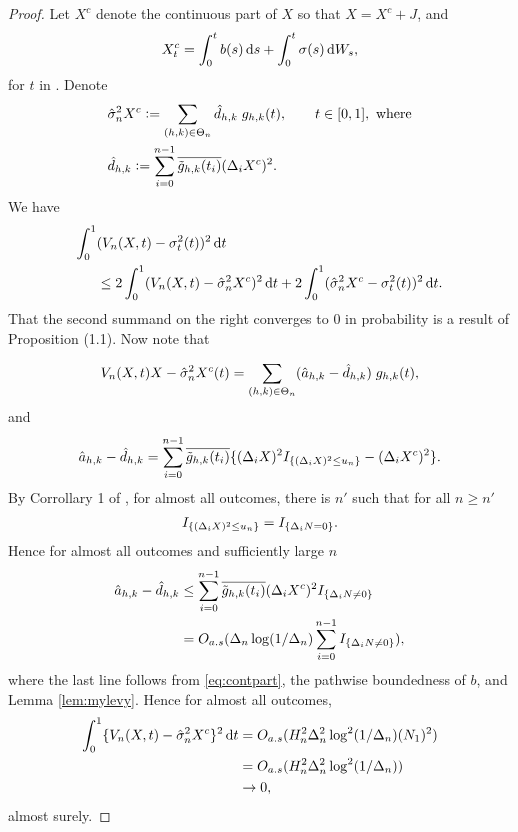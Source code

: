 \begin{proof} 
  Let $X^c$ denote the continuous part of $X$ so that $X = X^c + J$, and 
  \begin{align}
  X^c_t = \int^t_0 b(s) \D s + \int^t_0 \sigma(s) \D W_s,
    \label{eq:contpart}
  \end{align}
  for $t$ in \domain. Denote
  \begin{align}
    & \hat{\sigma}_{n}^2{X^c}:=\sum_{(h,k) \in \Theta_n} \hat{d}_{h,k}\;g_{h,k}(t), \qquad  t \in [0,1], \text{ where}\\
  &\hat{d}_{h,k} := \sum_{i =0}^{n-1} \overline{\tilde{g}_{h,k}(t_i)} (\Delta_i X^c)^2.  \notag
    \label{}
  \end{align}
We have
\begin{align}
  \int_0^1 & (\jvn  - \sv(t))^2\D t \notag\\
  & \le  2 \int_0^1  (\jvn  - \svn{X^c})^2\D t +   2\int_0^1  (\svn{X^c} - \sv(t) )^2\D t.
\end{align}
That the second summand on the right converges to 0 in probability is a result of Proposition (1.1). 
Now note that

\begin{align}
  V_n(X, t){X}  - \hat{\sigma}_{n}^2{X^c}(t) = \sum_{(h,k) \in \Theta_n} (\hat{a}_{h,k} - \hat{d}_{h,k})\;g_{h,k}(t),\notag
  \label{}
\end{align}
and 
\begin{align}
  \hat{a}_{h,k} - \hat{d}_{h,k} = \sum_{i =0}^{n-1} \overline{\tilde{g}_{h,k}(t_i)}\{ (\Delta_i X)^2 I_{\{(\Delta_i X)^2 \le u_n\}}- (\Delta_i X^c)^2\}.\notag
  \label{}
\end{align}
By Corrollary 1 of \cite{Mancini2009}, for almost all outcomes, there is $n'$ such that for all $n \ge n'$ 
\begin{align}
  I_{\{(\Delta_i X)^2 \le u_n\}} =I_{\{\Delta_i N = 0\}}. \notag
  \label{}
\end{align}
Hence for almost all outcomes and sufficiently large $n$  
\begin{align}
   \hat{a}_{h,k} - \hat{d}_{h,k} &\le \sum_{i =0}^{n-1} \overline{\tilde{g}_{h,k}(t_i)}  (\Delta_i X^c)^2  I_{\{\Delta_i N \not= 0\}}\notag\\
   & =  O_{a.s}( \Delta_n \log(1/\Delta_n)\sum_{i =0}^{n-1}I_{\{\Delta_i N \not= 0\}}),  \notag 
  \label{}
\end{align}
where the last line follows from \eqref{eq:contpart}, the pathwise boundedness of $b$, and Lemma \ref{lem:mylevy}.
Hence for almost all outcomes,
\begin{align}
  \int^1_0\{\jvn  - \svn{X^c}\}^2 \D t & = O_{a.s}( H_n^2 \Delta_n^2\log^2(1/\Delta_n) (N_1)^2)\notag\\
& = O_{a.s}(H_n^2 \Delta_n^2\log^2(1/\Delta_n))\notag \\
  & \to 0,
  \label{}
\end{align}
almost surely.
\end{proof}

